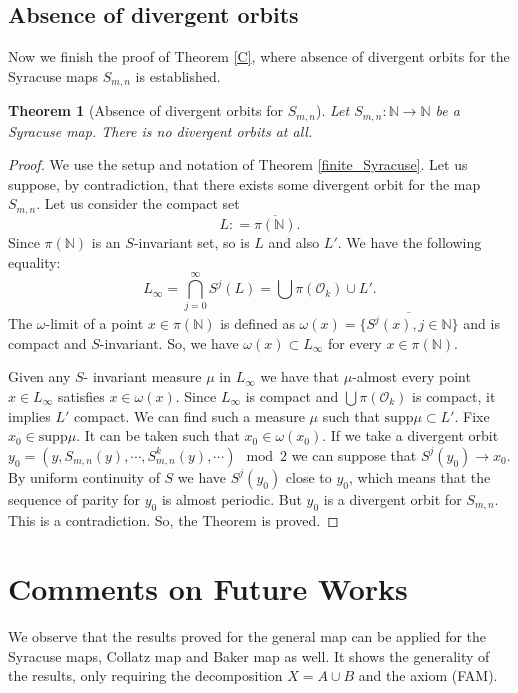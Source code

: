 \documentclass[12 pt]{amsart}
\newtheorem{theorem}{Theorem}
\theoremstyle{definition}
\begin{document}
	\subsection{Absence of divergent orbits} 
	
	Now we finish the proof of Theorem \ref{C}, where absence of divergent orbits for the Syracuse maps $S_{m,n}$ is established.
	
	\begin{theorem}[Absence of divergent orbits for $S_{m,n}$]
		Let $S_{m,n} : \mathbb{N} \to \mathbb{N}$ be a Syracuse map. There is no divergent orbits at all.
	\end{theorem}
	\begin{proof}
		We use the setup and notation of Theorem \ref{finite_Syracuse}. Let us suppose, by contradiction, that there exists some divergent orbit for the map $S_{m,n}$. Let us consider the compact set
		\[
		L : = \overline{\pi(\mathbb{N})}.
		\]
		Since $\pi(\mathbb{N})$ is an $S$-invariant set, so is $L$ and also $L'$. We have the following equality:
		\[
		L_{\infty} = \bigcap_{j=0}^{\infty} S^{j}(L) = \bigcup \pi(\mathcal{O}_{k}) \cup L'.
		\]
		The $\omega$-limit of a point $x \in \pi(\mathbb{N})$ is defined as  $\omega(x) = \overline{\{S^{j}(x), j \in \mathbb{N}\}}$ and is compact and $S$-invariant. So, we have $\omega(x) \subset L_{\infty}$ for every $x \in \pi(\mathbb{N})$.
		
		Given any $S$- invariant measure $\mu$ in $L_{\infty}$ we have that $\mu$-almost every point $x \in L_{\infty}$ satisfies $x \in \omega(x)$. Since $L_{\infty}$ is compact and $\bigcup \pi(\mathcal{O}_{k})$ is compact, it implies $L'$ compact. We can find such a measure $\mu$ such that $\text{supp}\mu \subset L'$. Fixe $x_{0} \in \text{supp}\mu$. It can be taken such that $x_{0} \in \omega(x_{0})$. If we take a divergent orbit $y_{0} = (y, S_{m,n}(y), \cdots, S_{m,n}^{k}(y), \cdots) \mod 2$ we can suppose that $S^{j}(y_{0}) \to x_{0}$. By uniform continuity of $S$ we have $S^{j}(y_{0})$ close to $y_{0}$, which means that the sequence of parity for $y_{0}$ is almost periodic. But $y_{0}$ is a divergent orbit for $S_{m,n}$. This is a contradiction. So, the Theorem is proved.
	\end{proof}
	

	\section{Comments on Future Works}
	
	We observe that the results proved for the general map can be applied for the Syracuse maps, Collatz map and Baker map as well. It shows the generality of the results, only requiring the decomposition $X = A \cup B$ and the axiom (FAM).
	
\end{document}
